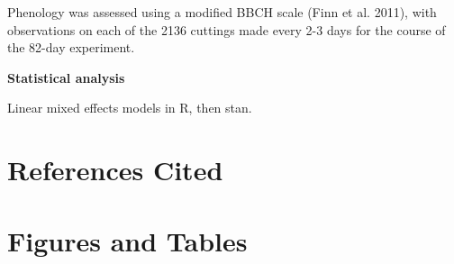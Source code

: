 \documentclass{article}
\begin{document}
Phenology was assessed using a modified BBCH scale (Finn et al. 2011), with observations on each of the 2136 cuttings made every 2-3 days for the course of the 82-day experiment.

\textbf{Statistical analysis}

Linear mixed effects models in R, then stan.

\section*{References Cited}




\section*{Figures and Tables}
\listoftables

\listoffigures
\end{document}

